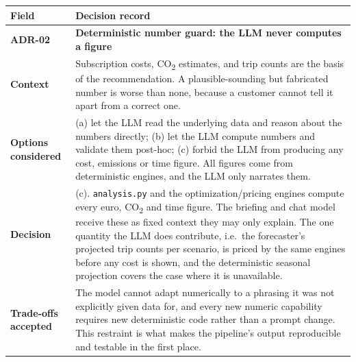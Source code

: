 \documentclass[
  11pt,
  a4paper,
  DIV=11,
  numbers=noendperiod,
  notitlepage]{scrreprt}
\newcounter{none} %
\begin{document}
{\def\LTcaptype{none} %
\begin{longtable}[]{@{}
  >{\raggedright\arraybackslash}p{}
  >{\raggedright\arraybackslash}p{}@{}}
\toprule\noalign{}
\begin{minipage}[b]{\linewidth}\raggedright
Field
\end{minipage} & \begin{minipage}[b]{\linewidth}\raggedright
Decision record
\end{minipage} \\
\midrule\noalign{}
\endhead
\bottomrule\noalign{}
\endlastfoot
\textbf{ADR-02} & \textbf{Deterministic number guard: the LLM never
computes a figure} \\
\textbf{Context} & Subscription costs, CO\textsubscript{2} estimates,
and trip counts are the basis of the recommendation. A
plausible-sounding but fabricated number is worse than none, because a
customer cannot tell it apart from a correct one. \\
\textbf{Options considered} & (a) let the LLM read the underlying data
and reason about the numbers directly; (b) let the LLM compute numbers
and validate them post-hoc; (c) forbid the LLM from producing any cost,
emissions or time figure. All figures come from deterministic engines,
and the LLM only narrates them. \\
\textbf{Decision} & (c). \texttt{analysis.py} and the
optimization/pricing engines compute every euro, CO\textsubscript{2} and
time figure. The briefing and chat model receive these as fixed context
they may only explain. The one quantity the LLM does contribute,
i.e.~the forecaster's projected trip counts per scenario, is priced by
the same engines before any cost is shown, and the deterministic
seasonal projection covers the case where it is unavailable. \\
\textbf{Trade-offs accepted} & The model cannot adapt numerically to a
phrasing it was not explicitly given data for, and every new numeric
capability requires new deterministic code rather than a prompt change.
This restraint is what makes the pipeline's output reproducible and
testable in the first place. \\
\end{longtable}
}
\end{document}
